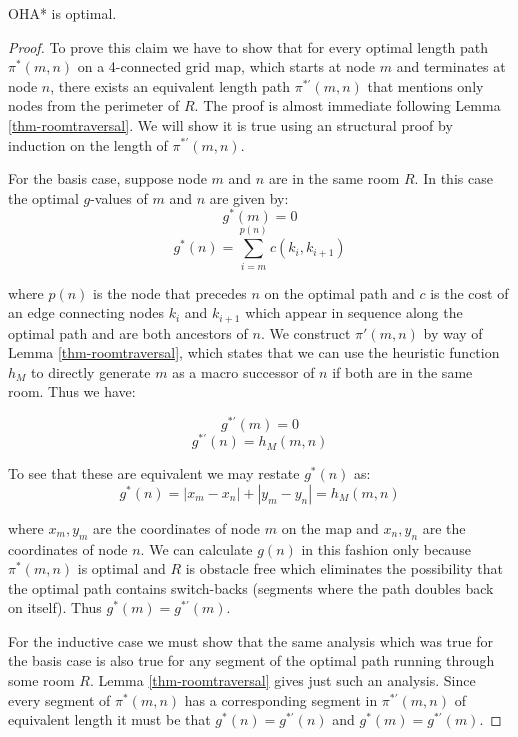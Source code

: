 \begin{mytheorem}
OHA* is optimal. 
\end{mytheorem}
\begin{proof}
To prove this claim we have to show that for every optimal length path $\pi^*(m, n)$ 
on a 4-connected grid map, which starts at node $m$ and terminates at node $n$, 
there exists an equivalent length path $\pi^{*'}(m, n)$ that mentions only nodes from the
perimeter of $R$.
The proof is almost immediate following Lemma \ref{thm-roomtraversal}. 
We will show it is true using an structural proof by induction on the length
of $\pi^{*'}(m, n)$.
\par
For the basis case, suppose node $m$ and $n$ are in the same room $R$.
In this case the optimal $g$-values of $m$ and $n$ are given by:
$$g^*(m) = 0$$
$$ g^*(n) =  \sum_{i = m}^{p(n)}c(k_{i}, k_{i+1})$$ 

where $p(n)$ is the node that precedes $n$ on the optimal path and $c$ is the cost of 
an edge connecting nodes $k_{i}$ and $k_{i+1}$ which appear in sequence along the optimal path 
and are both ancestors of $n$.
We construct $\pi'(m, n)$ by way of Lemma \ref{thm-roomtraversal}, 
which states that we can use the heuristic function $h_{M}$ to directly generate $m$ as a 
macro successor of $n$ if both are in the same room.
Thus we have:

$$ g^{*'}(m) = 0 $$
$$ g^{*'}(n) = h_{M}(m, n)$$

To see that these are equivalent we may restate $g^*(n)$ as:
$$g^*(n) = |x_{m} - x_{n}| + |y_{m} - y_{n}| = h_{M}(m, n)$$

where $x_{m}, y_{m}$ are the coordinates of node $m$ on the map and $x_{n}, y_{n}$ are
the coordinates of node $n$.
We can calculate $g(n)$ in this fashion only because $\pi^*(m,n)$ is optimal and $R$ is
obstacle free which eliminates the possibility that the optimal path contains
 switch-backs (segments where the path doubles back on itself).
Thus $g^{*}(m) = g^{*'}(m)$.
\par
For the inductive case we must show that the same analysis which was true for the basis case
is also true for any segment of the optimal path running through some room $R$. 
Lemma \ref{thm-roomtraversal} gives just such an analysis.
Since every segment of $\pi^{*}(m, n)$ has a corresponding segment in $\pi^{*'}(m, n)$ of equivalent
length it must be that $g^*(n) = g^{*'}(n)$ and $g^*(m) = g^{*'}(m)$.
\end{proof}

